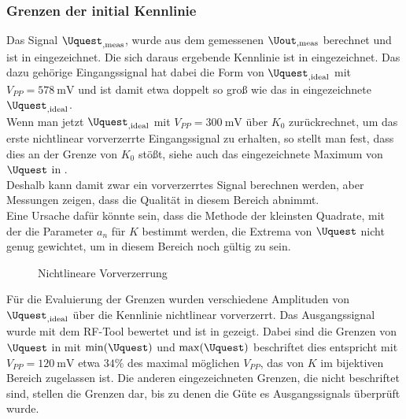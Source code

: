 \documentclass[../Report.tex]{subfiles}
\begin{document}
\subsubsection*{Grenzen der initial Kennlinie}
\label{subsubsec:opt.adjusta.problem}
Das Signal $\Uquest_{,\mathrm{meas}}$, wurde aus dem gemessenen $\Uout_{,\mathrm{meas}}$ berechnet und ist in  eingezeichnet. Die sich daraus ergebende Kennlinie ist in  eingezeichnet. Das dazu gehörige Eingangssignal hat dabei die Form von $\Uquest_{, \mathrm{ideal}}$ mit $V_{PP} = \SI{578}{\mV}$ und ist damit etwa doppelt so groß wie das in  eingezeichnete $\Uquest_{, \mathrm{ideal}}$.\\
Wenn man jetzt $\Uquest_{, \mathrm{ideal}}$ mit $V_{PP} = \SI{300}{\mV}$ über $K_0$ zurückrechnet, um das erste nichtlinear vorverzerrte Eingangssignal zu erhalten, so stellt man fest, dass dies an der Grenze von $K_0$ stößt, siehe auch das eingezeichnete Maximum von $\Uquest$ in . \\
Deshalb kann damit zwar ein vorverzerrtes Signal berechnen werden, aber Messungen zeigen, dass die Qualität in diesem Bereich abnimmt. \\
Eine Ursache dafür könnte sein, dass die Methode der kleinsten Quadrate, mit der die Parameter $a_n$ für $K$ bestimmt werden, die Extrema von $\Uquest$ nicht genug gewichtet, um in diesem Bereich noch gültig zu sein.
\begin{figure}[H]
\begin{subfigure}{0.5 \textwidth}
	\setlength\figureheight{7.5cm}
	\setlength\figurewidth{7.5cm}
    	
	\label{fig:K0}
\end{subfigure}
\begin{subfigure}{0.5 \textwidth}
	\setlength\figureheight{7.5cm}
	\setlength\figurewidth{7.5cm}
    
	\label{fig:UinUquest}
\end{subfigure}
\caption{Nichtlineare Vorverzerrung}
\label{fig:Amplitudenproblem}
\end{figure}

Für die Evaluierung der Grenzen wurden verschiedene Amplituden von $\Uquest_{,\textrm{ideal}}$ über die Kennlinie nichtlinear vorverzerrt. Das Ausgangssignal wurde mit dem RF-Tool \cite{RF-Tool} bewertet und ist in  gezeigt. Dabei sind die Grenzen von $\Uquest$ in  mit $\min(\Uquest)$ und $\max(\Uquest)$ beschriftet dies entspricht mit $V_{PP} = \SI{120}{\mV}$ etwa $34\%$ des maximal möglichen $V_{PP}$, das von $K$ im bijektiven Bereich zugelassen ist. Die anderen eingezeichneten Grenzen, die nicht beschriftet sind, stellen die Grenzen dar, bis zu denen die Güte es Ausgangssignals überprüft wurde.
\end{document}
